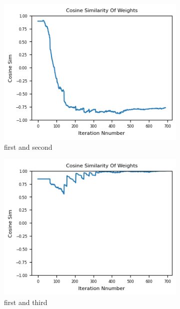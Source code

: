 \documentclass[12pt]{article}
\begin{document}
\begin{figure}[H]
\centering
  \begin{subfigure}[b]{0.30\textwidth}
    \includegraphics[width=\textwidth]{Figs/0-1.png}
    \caption{first and second}
  \end{subfigure}
  \hspace*{10}
  \begin{subfigure}[b]{0.3\textwidth}
    \includegraphics[width=\textwidth]{Figs/0-2.png}
    \caption{first and third}
  \end{subfigure}
  \hspace*{10}
  \begin{subfigure}[b]{0.3\textwidth}

\end{subfigure}
\end{figure}
\end{document}
